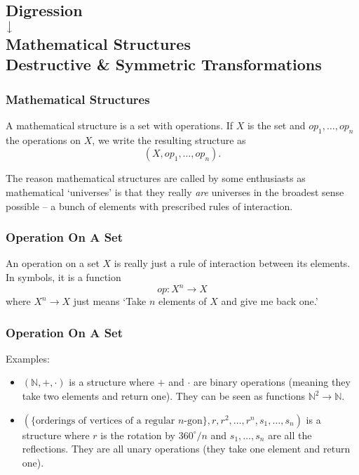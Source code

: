 \documentclass[aspectratio=169,11pt,usenames,dvipsnames,handout]{beamer}
\newcommand{\N}{\mathbb{N}}
\begin{document}
\subsection{Digression\\ $\big\downarrow$\\Mathematical Structures\\ Destructive \&
Symmetric Transformations}

\begin{frame}
 \subsectionpage
\end{frame}

\begin{frame}
 \frametitle{Mathematical Structures}
 \begin{tcolorbox}[title=Mathematical Structure (also `Universe')]
  A \alert{mathematical} structure is a \alert{set} with \alert{operations}. If
  $X$ is the set and $op_1,\ldots,op_n$ the operations on $X$, we write the
  resulting structure as
  \[
   (X,op_1,\ldots,op_n).
  \]
 \end{tcolorbox}
 \pause
 The reason mathematical structures are called by some enthusiasts as
 mathematical `universes' is that they really \emph{are} universes in the
 broadest sense possible -- a bunch of elements with prescribed rules of
 interaction.
\end{frame}

\begin{frame}
 \frametitle{Operation On A Set}
 \begin{tcolorbox}[title=Operation]
  An \alert{operation} on a set $X$ is really just a \alert{rule of
  interaction} between its elements. In symbols, it is a \alert{function}
  \[
   op: X^{n} \to X
  \]
  where $X^{n} \to X$ just means `Take $n$ elements of $X$ and give me back
  one.'
 \end{tcolorbox}
\end{frame}

\begin{frame}
 \frametitle{Operation On A Set}
 \alert{Examples:}
 \begin{itemize}
  \item $(\N,+, \cdot )$ is a structure where $+$ and $ \cdot $ are
   \alert{binary} operations (meaning they take two elements and return one).
   They can be seen as functions $\N^2 \to \N$.\pause
  \item $(\{\text{orderings of vertices of a regular $n$-gon}\}, r,
   r^{2},\ldots, r^{n}, s_1,\ldots,s_n)$ is a structure where $r$ is the
   rotation by $360^{ \circ } / n$ and $s_1,\ldots,s_n$ are all the reflections.
   They are all \alert{unary} operations (they take one element and return one).
 \end{itemize}
\end{frame}
\end{document}

